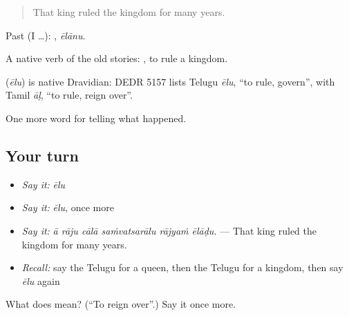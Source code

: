 \begin{quote}
That king ruled the kingdom for many years.
\end{quote}

Past (I …): , \emph{ēlānu}.

A native verb of the old stories:  , to rule a kingdom.

\begin{cousinweb}
\textbf{} (\emph{ēlu}) is native Dravidian: DEDR 5157 lists Telugu \emph{ēlu}, \textquotedblleft{}to rule, govern\textquotedblright{}, with Tamil \emph{āḷ}, \textquotedblleft{}to rule, reign over\textquotedblright{}.
\end{cousinweb}

\begin{grammarlens}[title={What you've built}]
One more word for telling what happened.
\end{grammarlens}

\subsection*{Your turn}
\begin{itemize}
\raggedright
  \item \emph{Say it:} \emph{ēlu}
  \item \emph{Say it:} \emph{ēlu}, once more
  \item \emph{Say it:} \emph{ā rāju cālā saṁvatsarālu rājyaṁ ēlāḍu.} — That king ruled the kingdom for many years.
  \item \emph{Recall:} say the Telugu for a queen, then the Telugu for a kingdom, then say \emph{ēlu} again
\end{itemize}

\begin{tcolorbox}[breakable,colback=teal!4,colframe=teal!35!black,title={Before you move on}]
What does  mean? (\textquotedblleft{}To reign over\textquotedblright{}.) Say it once more.
\end{tcolorbox}
